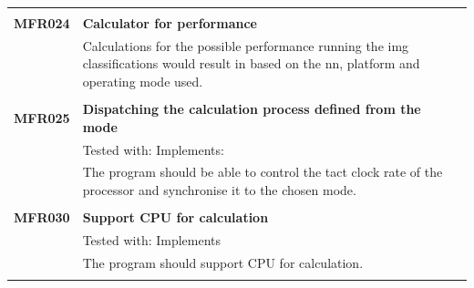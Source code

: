 \documentclass[parskip=full]{scrartcl}
\begin{document}
\begin{tabular}{p{2cm}p{12cm}}
& \\
\textbf{MFR024} & \textbf{Calculator for performance}\\                                     
& Calculations for the possible performance running the \gls{img} classifications would result in based on the \gls{nn}, platform and operating mode used.\\
& \\
\textbf {MFR025} & \textbf{Dispatching the calculation process defined from the mode}\\
& Tested with: Implements: \\
& The program should be able to control the tact clock rate of the processor and synchronise it to the chosen mode. \\
& \\
\textbf {MFR030} & \textbf{Support CPU for calculation} \\
& Tested with: Implements \\
& The program should support CPU for calculation. \\
& \\
\end{tabular}
\newpage
\end{document}
